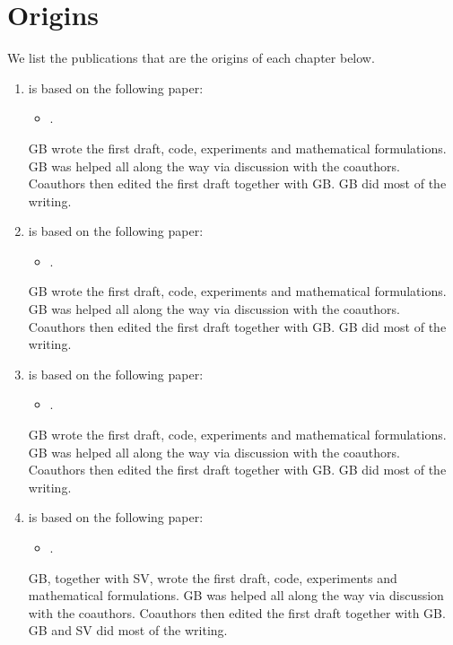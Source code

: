 
\section{Origins}
\label{section:introduction:origins}

We list the publications that are the origins of each chapter below.

\begin{enumerate}[label=\textbf{Chapter~\arabic*},align=left]
\setcounter{enumi}{0}

\item is based on the following paper:
\begin{itemize}
\item {}.
\end{itemize}
GB wrote the first draft, code, experiments and mathematical formulations. GB was helped all along the way via discussion with the coauthors. Coauthors then edited the first draft together with GB. GB did most of the writing.


\item is based on the following paper:
\begin{itemize}
\item {}.
\end{itemize}
GB wrote the first draft, code, experiments and mathematical formulations. GB was helped all along the way via discussion with the coauthors. Coauthors then edited the first draft together with GB. GB did most of the writing.


\item is based on the following paper:
\begin{itemize}
\item {}.
\end{itemize}
GB wrote the first draft, code, experiments and mathematical formulations. GB was helped all along the way via discussion with the coauthors. Coauthors then edited the first draft together with GB. GB did most of the writing.


\item is based on the following paper:
\begin{itemize}
\item {}.
\end{itemize}
GB, together with SV, wrote the first draft, code, experiments and mathematical formulations. GB was helped all along the way via discussion with the coauthors. Coauthors then edited the first draft together with GB. GB and SV did most of the writing.


\end{enumerate}

